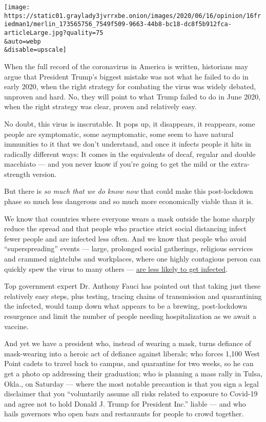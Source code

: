 \texttt{[image: https://static01.graylady3jvrrxbe.onion/images/2020/06/16/opinion/16friedman1/merlin\_173565756\_7549f509-9663-44b8-bc18-dc8f5b912fca-articleLarge.jpg?quality=75\\\&auto=webp\\\&disable=upscale]}

When the full record of the coronavirus in America is written,
historians may argue that President Trump's biggest mistake was not what
he failed to do in early 2020, when the right strategy for combating the
virus was widely debated, unproven and hard. No, they will point to what
Trump failed to do in June 2020, when the right strategy was clear,
proven and relatively easy.

No doubt, this virus is inscrutable. It pops up, it disappears, it
reappears, some people are symptomatic, some asymptomatic, some seem to
have natural immunities to it that we don't understand, and once it
infects people it hits in radically different ways: It comes in the
equivalents of decaf, regular and double macchiato --- and you never
know if you're going to get the mild or the extra-strength version.

But there is \emph{so much that we do know now} that could make this
post-lockdown phase so much less dangerous and so much more economically
viable than it is.

We know that countries where everyone wears a mask outside the home
sharply reduce the spread and that people who practice strict social
distancing infect fewer people and are infected less often. And we know
that people who avoid ``superspreading'' events --- large, prolonged
social gatherings, religious services and crammed nightclubs and
workplaces, where one highly contagious person can quickly spew the
virus to many others ---
\href{https://arstechnica.com/science/2020/06/just-10-20-of-covid-19-cases-behind-80-of-transmission-studies-suggest/}{are
less likely to get infected}.

Top government expert Dr. Anthony Fauci has pointed out that taking just
these relatively easy steps, plus testing, tracing chains of
transmission and quarantining the infected, would tamp down what appears
to be a brewing, post-lockdown resurgence and limit the number of people
needing hospitalization as we await a vaccine.

And yet we have a president who, instead of wearing a mask, turns
defiance of mask-wearing into a heroic act of defiance against liberals;
who forces 1,100 West Point cadets to travel back to campus, and
quarantine for two weeks, so he can get a photo op addressing their
graduation; who is planning a mass rally in Tulsa, Okla., on Saturday
--- where the most notable precaution is that you sign a legal
disclaimer that you ``voluntarily assume all risks related to exposure
to Covid-19 and agree not to hold Donald J. Trump for President Inc.''
liable --- and who hails governors who open bars and restaurants for
people to crowd together.

